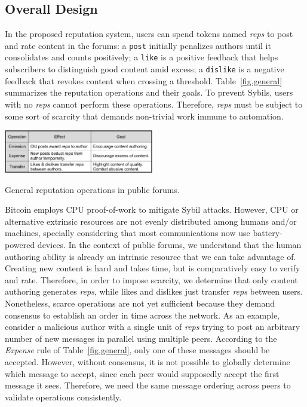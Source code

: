 \documentclass[10pt,journal,compsoc]{IEEEtran}
\newcommand{\reps}     {\emph{reps}\xspace}
\newcommand{\code}[1]  {\texttt{\footnotesize{#1}}}
\begin{document}
\subsection{Overall Design}
\label{sec.consensus.design}

In the proposed reputation system, users can spend tokens named \reps to post
and rate content in the forums:
a \code{post} initially penalizes authors until it consolidates and counts
positively;
a \code{like} is a positive feedback that helps subscribers to distinguish good
content amid excess;
a \code{dislike} is a negative feedback that revokes content when crossing a
threshold.
Table~\ref{fig.general} summarizes the reputation operations and their goals.
To prevent Sybils, users with no \reps cannot perform these operations.
Therefore, \reps must be subject to some sort of scarcity that demands
non-trivial work immune to automation.

\begin{table}
\centering
\includegraphics[width=0.49\textwidth]{general.png}
\caption{General reputation operations in public forums.}
\label{fig.general}
\end{table}

Bitcoin employs CPU proof-of-work to mitigate Sybil attacks.
However, CPU or alternative extrinsic resources are not evenly distributed
among humans and/or machines, specially considering that most communications
now use battery-powered devices.
%
In the context of public forums, we understand that the human authoring ability
is already an intrinsic resource that we can take advantage of.
Creating new content is hard and takes time, but is comparatively easy to
verify and rate.
Therefore, in order to impose scarcity, we determine that only content
authoring generates \reps, while likes and dislikes just transfer \reps between
users.
%
Nonetheless, scarce operations are not yet sufficient because they demand
consensus to establish an order in time across the network.
As an example, consider a malicious author with a single unit of \reps trying
to post an arbitrary number of new messages in parallel using multiple peers.
According to the \emph{Expense} rule of Table~\ref{fig.general}, only one of
these messages should be accepted.
However, without consensus, it is not possible to globally determine which
message to accept, since each peer would supposedly accept the first message it
sees.
Therefore, we need the same message ordering across peers to validate
operations consistently.
\end{document}
